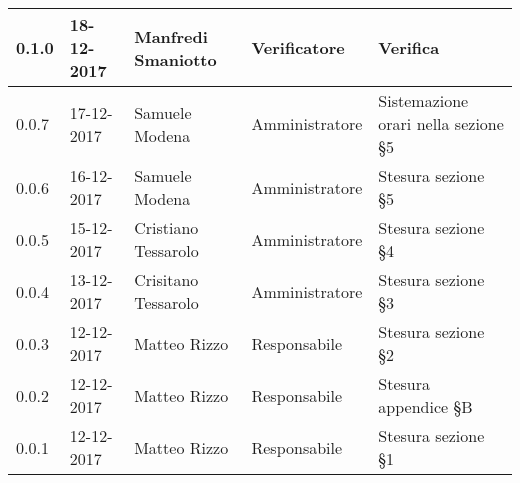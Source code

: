 \documentclass[./PianodiProgetto.tex]{subfiles}
\begin{document}
\begin{longtable}{|p{20mm}|p{20mm}|p{40mm}|p{30mm}|p{50mm}|}
		\hline 0.1.0 & 18-12-2017 & Manfredi Smaniotto & Verificatore & Verifica \\
 		
 		\hline 0.0.7 & 17-12-2017 & Samuele Modena & Amministratore & Sistemazione orari nella sezione §5 \\
 		
		\hline 0.0.6 & 16-12-2017 & Samuele Modena & Amministratore & Stesura sezione §5 \\
 
		\hline 0.0.5 & 15-12-2017 & Cristiano Tessarolo & Amministratore & Stesura sezione §4 \\
 
		\hline 0.0.4 & 13-12-2017 & Crisitano Tessarolo & Amministratore & Stesura sezione §3 \\
 
		\hline 0.0.3 & 12-12-2017 & Matteo Rizzo & Responsabile & Stesura sezione §2 \\
 
 		\hline 0.0.2 & 12-12-2017 & Matteo Rizzo & Responsabile & Stesura appendice §B \\
 		
		\hline 0.0.1 & 12-12-2017 & Matteo Rizzo & Responsabile & Stesura sezione §1 \\
 
		\hline
 
	\end{longtable}
\end{document}
